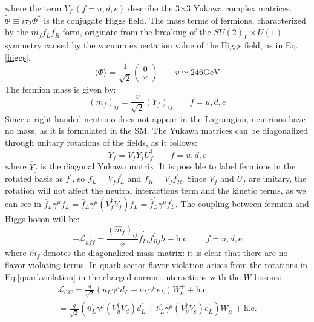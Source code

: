 where the term $Y_f \ (f  =  u,d,e)$ describe the 3$\times$3 Yukawa complex matrices. $\widetilde{\Phi} \equiv i \tau_2 \Phi^*$ is the conjugate Higgs field. The mass terms of fermions, characterized by the $m_f \bar{f}_L f_R$ form, originate from the breaking of the $SU(2)_L \times U(1)$ symmetry caused by the vacuum expectation value of the Higgs field, as in Eq.\ref{higgs}.
\begin{equation}\label{higgs}
\langle\Phi\rangle=\frac{1}{\sqrt{2}}\left(\begin{array}{l}
0 \\
v
\end{array}\right) \qquad v \simeq 246 \mathrm{GeV}
\end{equation}
The fermion mass is given by:
\begin{equation}
\left(m_f\right)_{i j}=\frac{v}{\sqrt{2}}\left(Y_f\right)_{i j} \qquad f=u, d, e
\end{equation}
Since a right-handed neutrino does not appear in the Lagrangian, neutrinos have no mass, as it is formulated in the SM. The Yukawa matrices can be diagonalized through unitary rotations of the fields, as it follows:
\begin{equation}
Y_f=V_f \hat{Y}_f U_f^{\dagger} \qquad f=u, d, e
\end{equation}
where $ \hat{Y}_f $ is the diagonal Yukawa matrix. It is possible to label fermions in the rotated basis as $f^{\prime}$, so $f_L=V_f f^{\prime}_L$ and $f_R=V_f f^{\prime}_R $. Since $V_f$ and $U_f$ are unitary, the rotation will not affect the neutral interactions term and the kinetic terms, as we can see in $\bar{f}_L \gamma^\mu f_L=\bar{f}_L \gamma^\mu\left(V_f^{\dagger} V_f\right) f_L=\bar{f}_L^{\prime} \gamma^\mu f_L^{\prime}$. The coupling between fermion and Higgs boson will be:
\begin{equation}
-\mathscr{L}_{h \bar{f} f}=\frac{(\hat{m}_f)_{i j}}{v} \bar{f}_{L i}^{\prime}f^{\prime}_{R j} h+\text{h.c.} \qquad f=u, d, e
\end{equation}
where $\hat{m}_f$ denotes the diagonalized mass matrix: it is clear that there are no flavor-violating terms.
In quark sector flavor-violation arises from the rotations in Eq.\ref{quarkviolation} in the charged-current interactions with the $W$ bosons:
\begin{equation}\label{quarkviolation}
\begin{array}{c}
      { \displaystyle 
\mathscr{L}_{C C}  =\frac{g}{\sqrt{2}}\left(\bar{u}_L \gamma^\mu d_L+\bar{\nu}_L \gamma^\mu e_L\right) W_\mu^{+}+\text {h.c.} }\\
 {\displaystyle=\frac{g}{\sqrt{2}}\left(\bar{u}^{\prime}_L \gamma^\mu\left(V_u^{\dagger} V_d\right) d_L^{\prime}+\bar{\nu}^{\prime}_L \gamma^\mu\left(V_\nu^{\dagger} V_e\right) e_L^{\prime}\right) W_\mu^{+}+\text {h.c.}}
\end{array}
\end{equation}


